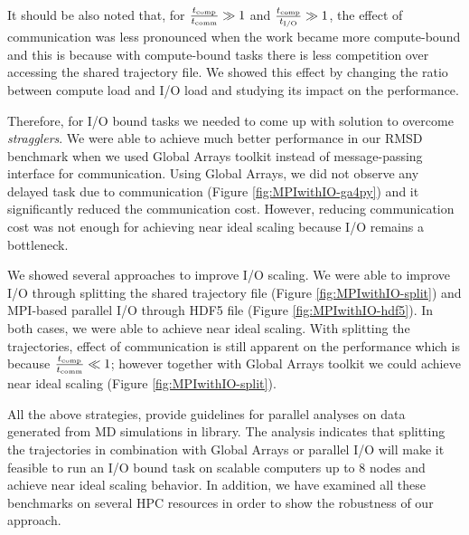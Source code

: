 It should be also noted that, for $\frac{{t}_{\text{comp}}}{t_{\text{comm}}} \gg 1$ and $\frac{{t}_{\text{comp}}}{{t}_{\text{I/O}}} \gg 1$, the effect of communication was less pronounced when the work became more compute-bound and this 
is because with compute-bound tasks there is less competition over accessing the shared trajectory file.
We showed this effect by changing the ratio between compute load and I/O load and studying its impact on the performance.

Therefore, for I/O bound tasks we needed to come up with solution to overcome \emph{stragglers}. 
We were able to achieve much better performance in our RMSD benchmark when we used Global Arrays toolkit instead of message-passing interface for communication. 
Using Global Arrays, we did not observe any delayed task due to communication (Figure \ref{fig:MPIwithIO-ga4py}) and it significantly reduced the communication cost. 
However, reducing communication cost was not enough for achieving near ideal scaling because I/O remains a bottleneck.

We showed several approaches to improve I/O scaling.
We were able to improve I/O through splitting the shared trajectory file (Figure \ref{fig:MPIwithIO-split}) and MPI-based parallel I/O through HDF5 file (Figure \ref{fig:MPIwithIO-hdf5}). 
In both cases, we were able to achieve near ideal scaling.
With splitting the trajectories, effect of communication is still apparent on the performance which is because $\frac{{t}_{\text{comp}}}{t_{\text{comm}}} \ll 1$; however together with 
Global Arrays toolkit we could achieve near ideal scaling (Figure \ref{fig:MPIwithIO-split}).

All the above strategies, provide guidelines for parallel analyses on data generated from MD simulations in  library.
The analysis indicates that splitting the trajectories in combination with Global Arrays or parallel I/O will make it feasible to run an I/O bound task on scalable computers up to 8 nodes and achieve near ideal scaling behavior.
In addition, we have examined all these benchmarks on several HPC resources in order to show the robustness of our approach.